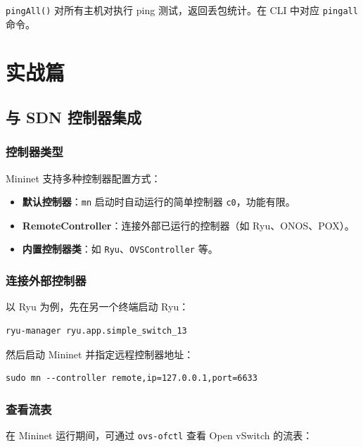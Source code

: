 \documentclass[12pt,a4paper,openany]{ctexbook}
\begin{document}
\texttt{pingAll()} 对所有主机对执行 ping 测试，返回丢包统计。在 CLI 中对应 \texttt{pingall} 命令。


\part{实战篇}

\chapter{与 SDN 控制器集成}

\section{控制器类型}

Mininet 支持多种控制器配置方式：

\begin{itemize}[leftmargin=*]
	\item \textbf{默认控制器}：\texttt{mn} 启动时自动运行的简单控制器 \texttt{c0}，功能有限。
	\item \textbf{RemoteController}：连接外部已运行的控制器（如 Ryu、ONOS、POX）。
	\item \textbf{内置控制器类}：如 \texttt{Ryu}、\texttt{OVSController} 等。
\end{itemize}

\section{连接外部控制器}

以 Ryu 为例，先在另一个终端启动 Ryu：

\begin{lstlisting}[style=bashstyle]
	ryu-manager ryu.app.simple_switch_13
\end{lstlisting}

然后启动 Mininet 并指定远程控制器地址：

\begin{lstlisting}[style=bashstyle]
	sudo mn --controller remote,ip=127.0.0.1,port=6633
\end{lstlisting}

\section{查看流表}

在 Mininet 运行期间，可通过 \texttt{ovs-ofctl} 查看 Open vSwitch 的流表：
\end{document}
